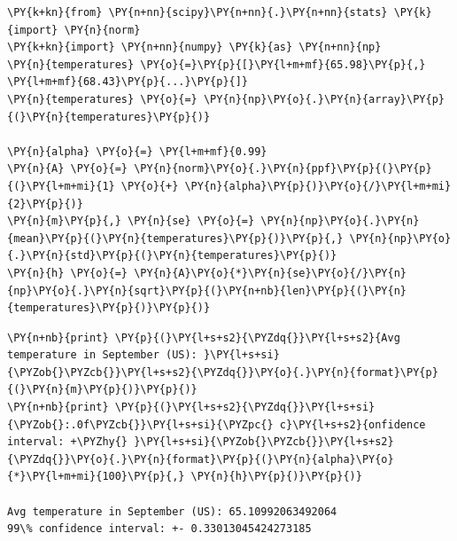 \begin{Answer}
\begin{codebox}[size=fbox, boxrule=1pt, colback=cellbackground, colframe=cellborder]
\begin{Verbatim}[commandchars=\\\{\}]
\PY{k+kn}{from} \PY{n+nn}{scipy}\PY{n+nn}{.}\PY{n+nn}{stats} \PY{k}{import} \PY{n}{norm}
\PY{k+kn}{import} \PY{n+nn}{numpy} \PY{k}{as} \PY{n+nn}{np}
\PY{n}{temperatures} \PY{o}{=}\PY{p}{[}\PY{l+m+mf}{65.98}\PY{p}{,} \PY{l+m+mf}{68.43}\PY{p}{...}\PY{p}{]}
\PY{n}{temperatures} \PY{o}{=} \PY{n}{np}\PY{o}{.}\PY{n}{array}\PY{p}{(}\PY{n}{temperatures}\PY{p}{)}

\PY{n}{alpha} \PY{o}{=} \PY{l+m+mf}{0.99}
\PY{n}{A} \PY{o}{=} \PY{n}{norm}\PY{o}{.}\PY{n}{ppf}\PY{p}{(}\PY{p}{(}\PY{l+m+mi}{1} \PY{o}{+} \PY{n}{alpha}\PY{p}{)}\PY{o}{/}\PY{l+m+mi}{2}\PY{p}{)}
\PY{n}{m}\PY{p}{,} \PY{n}{se} \PY{o}{=} \PY{n}{np}\PY{o}{.}\PY{n}{mean}\PY{p}{(}\PY{n}{temperatures}\PY{p}{)}\PY{p}{,} \PY{n}{np}\PY{o}{.}\PY{n}{std}\PY{p}{(}\PY{n}{temperatures}\PY{p}{)}
\PY{n}{h} \PY{o}{=} \PY{n}{A}\PY{o}{*}\PY{n}{se}\PY{o}{/}\PY{n}{np}\PY{o}{.}\PY{n}{sqrt}\PY{p}{(}\PY{n+nb}{len}\PY{p}{(}\PY{n}{temperatures}\PY{p}{)}\PY{p}{)}
\end{Verbatim}
\end{codebox}

\begin{codebox}[size=fbox, boxrule=1pt, colback=cellbackground, colframe=cellborder]
\begin{Verbatim}[commandchars=\\\{\}]
\PY{n+nb}{print} \PY{p}{(}\PY{l+s+s2}{\PYZdq{}}\PY{l+s+s2}{Avg temperature in September (US): }\PY{l+s+si}{\PYZob{}\PYZcb{}}\PY{l+s+s2}{\PYZdq{}}\PY{o}{.}\PY{n}{format}\PY{p}{(}\PY{n}{m}\PY{p}{)}\PY{p}{)} 
\PY{n+nb}{print} \PY{p}{(}\PY{l+s+s2}{\PYZdq{}}\PY{l+s+si}{\PYZob{}:.0f\PYZcb{}}\PY{l+s+si}{\PYZpc{} c}\PY{l+s+s2}{onfidence interval: +\PYZhy{} }\PY{l+s+si}{\PYZob{}\PYZcb{}}\PY{l+s+s2}{\PYZdq{}}\PY{o}{.}\PY{n}{format}\PY{p}{(}\PY{n}{alpha}\PY{o}{*}\PY{l+m+mi}{100}\PY{p}{,} \PY{n}{h}\PY{p}{)}\PY{p}{)}

Avg temperature in September (US): 65.10992063492064
99\% confidence interval: +- 0.33013045424273185
\end{Verbatim}
\end{codebox}
\end{Answer}

